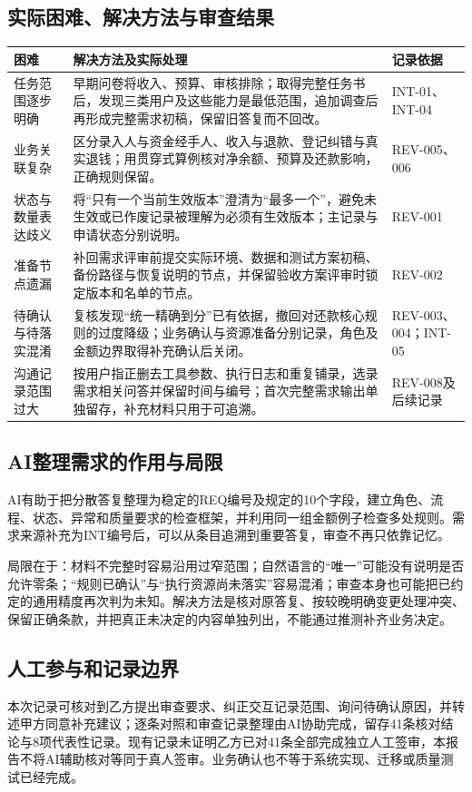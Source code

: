 \documentclass[UTF8,a4paper,11pt,fontset=fandol]{ctexart}
\renewcommand{\arraystretch}{1.3}
\newcommand{\smalltable}{\small\setlength{\tabcolsep}{5pt}\renewcommand{\arraystretch}{1.25}}
\begin{document}
\subsection{实际困难、解决方法与审查结果}
\begin{center}\smalltable
\begin{tabularx}{\linewidth}{p{25mm}Yp{27mm}}
\toprule
{}困难 & 解决方法及实际处理 & 记录依据\\
\midrule
任务范围逐步明确 & 早期问卷将收入、预算、审核排除；取得完整任务书后，发现三类用户及这些能力是最低范围，追加调查后再形成完整需求初稿，保留旧答复而不回改。 & INT-01、INT-04\\
业务关联复杂 & 区分录入人与资金经手人、收入与退款、登记纠错与真实退钱；用贯穿式算例核对净余额、预算及还款影响，正确规则保留。 & REV-005、006\\
状态与数量表达歧义 & 将“只有一个当前生效版本”澄清为“最多一个”，避免未生效或已作废记录被理解为必须有生效版本；主记录与申请状态分别说明。 & REV-001\\
准备节点遗漏 & 补回需求评审前提交实际环境、数据和测试方案初稿、备份路径与恢复说明的节点，并保留验收方案评审时锁定版本和名单的节点。 & REV-002\\
待确认与待落实混淆 & 复核发现“统一精确到分”已有依据，撤回对还款核心规则的过度降级；业务确认与资源准备分别记录，角色及金额边界取得补充确认后关闭。 & REV-003、004；INT-05\\
沟通记录范围过大 & 按用户指正删去工具参数、执行日志和重复铺录，选录需求相关问答并保留时间与编号；首次完整需求输出单独留存，补充材料只用于可追溯。 & REV-008及后续记录\\
\bottomrule
\end{tabularx}
\end{center}

\subsection{AI整理需求的作用与局限}
AI有助于把分散答复整理为稳定的REQ编号及规定的10个字段，建立角色、流程、状态、异常和质量要求的检查框架，并利用同一组金额例子检查多处规则。需求来源补充为INT编号后，可以从条目追溯到重要答复，审查不再只依靠记忆。

局限在于：材料不完整时容易沿用过窄范围；自然语言的“唯一”可能没有说明是否允许零条；“规则已确认”与“执行资源尚未落实”容易混淆；审查本身也可能把已约定的通用精度再次判为未知。解决方法是核对原答复、按较晚明确变更处理冲突、保留正确条款，并把真正未决定的内容单独列出，不能通过推测补齐业务决定。

\subsection{人工参与和记录边界}
本次记录可核对到乙方提出审查要求、纠正交互记录范围、询问待确认原因，并转述甲方同意补充建议；逐条对照和审查记录整理由AI协助完成，留存41条核对结论与8项代表性记录。现有记录未证明乙方已对41条全部完成独立人工签审，本报告不将AI辅助核对等同于真人签审。业务确认也不等于系统实现、迁移或质量测试已经完成。
\end{document}
